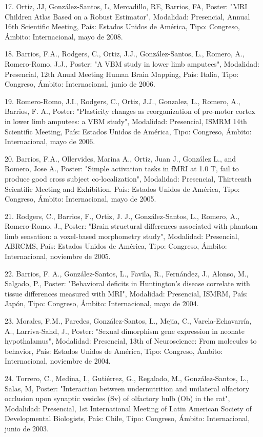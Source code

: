 17. Ortiz, JJ, González-Santos, L, Mercadillo, RE, Barrios, FA, Poster: "MRI Children Atlas Based on 
a Robust Estimator", Modalidad: Presencial, Annual 16th Scientific Meeting, País: Estados Unidos de 
América, Tipo: Congreso, Ámbito: Internacional, mayo de 2008.

18. Barrios, F.A., Rodgers, C., Ortiz, J.J., González-Santos, L., Romero, A., Romero-Romo, J.J., 
Poster: "A VBM study in lower limb amputees", Modalidad: Presencial, 12th Anual Meeting Human Brain 
Mapping, País: Italia, Tipo: Congreso, Ámbito: Internacional, junio de 2006.

19. Romero-Romo, J.I., Rodgers, C., Ortiz, J.J., Gonzalez, L., Romero, A., Barrios, F. A., Poster: 
"Plasticity changes as reorganization of pre-motor cortex in lower limb amputees: a VBM study", 
Modalidad: Presencial, ISMRM 14th Scientific Meeting, País: Estados Unidos de América, Tipo: 
Congreso, Ámbito: Internacional, mayo de 2006.

20. Barrios, F.A., Ollervides, Marina A., Ortiz, Juan J., González L., and Romero, Jose A., Poster: 
"Simple activation tasks in fMRI at 1.0 T, fail to produce good cross subject co-localization", 
Modalidad: Presencial, Thirteenth Scientific Meeting and Exhibition, País: Estados Unidos de 
América, Tipo: Congreso, Ámbito: Internacional, mayo de 2005.

21. Rodgers, C., Barrios, F., Ortiz, J. J., González-Santos, L., Romero, A., Romero-Romo, J., 
Poster: "Brain structural differences associated with phantom limb sensation: a voxel-based 
morphometry study", Modalidad: Presencial, ABRCMS, País: Estados Unidos de América, Tipo: Congreso, 
Ámbito: Internacional, noviembre de 2005.

22. Barrios, F. A., González-Santos, L., Favila, R., Fernández, J., Alonso, M., Salgado, P., Poster: 
"Behavioral deficits in Huntington’s disease correlate with tissue differences measured with MRI", 
Modalidad: Presencial, ISMRM, País: Japón, Tipo: Congreso, Ámbito: Internacional, mayo de 2004.

23. Morales, F.M., Paredes, González-Santos, L., Mejia, C., Varela-Echavarría, A., Larriva-Sahd, J., 
Poster: "Sexual dimorphism gene expression in neonate hypothalamus", Modalidad: Presencial, 13th of 
Neuroscience: From molecules to behavior, País: Estados Unidos de América, Tipo: Congreso, Ámbito: 
Internacional, noviembre de 2004.

24. Torrero, C., Medina, I., Gutiérrez, G., Regalado, M., González-Santos, L., Salas, M, Poster: 
"Interaction between undernutrition and unilateral olfactory occlusion upon synaptic vesicles (Sv) 
of olfactory bulb (Ob) in the rat", Modalidad: Presencial, 1st International Meeting of Latin 
American Society of Developmental Biologists, País: Chile, Tipo: Congreso, Ámbito: Internacional, 
junio de 2003.

